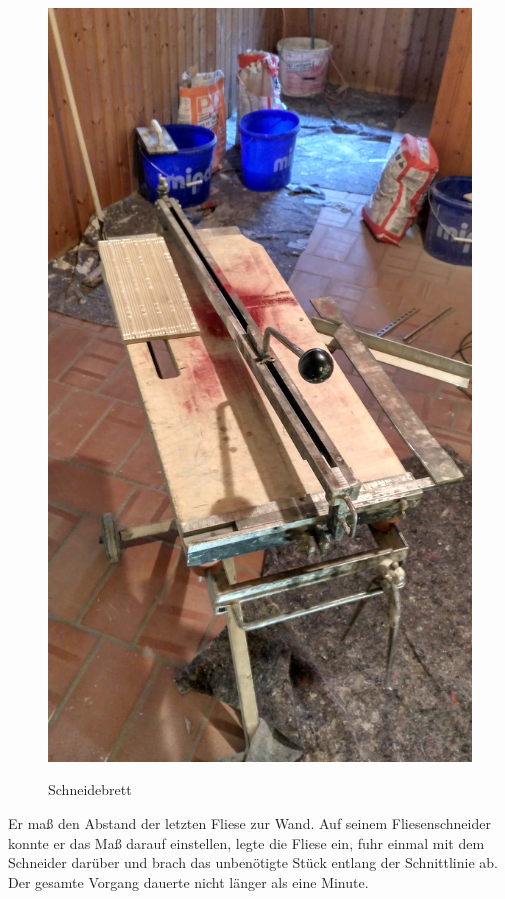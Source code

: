 \begin{figure}[h]
	\begin{center}
		\noindent\includegraphics[scale=0.1]{Resources/Praktikum/IMG_20180807_120442_HDR.jpg}
		\label{schneider}
		\caption{Schneidebrett}	
	\end{center}
\end{figure}

Er maß den Abstand der letzten Fliese zur Wand. Auf seinem Fliesenschneider konnte er das Maß darauf einstellen, legte die Fliese ein, fuhr einmal mit dem Schneider darüber und brach das unbenötigte Stück entlang der Schnittlinie ab. Der gesamte Vorgang dauerte nicht länger als eine Minute.

